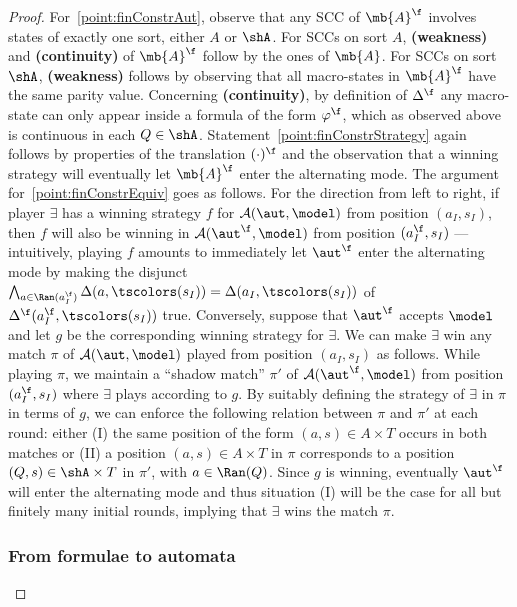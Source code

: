 \begin{proof}
For~\ref{point:finConstrAut}, observe that any SCC
of $\mb{A}^{\f}$ involves states of exactly one sort, either $A$ or $\shA$. For SCCs on sort $A$, \textbf{(weakness)} and \textbf{(continuity)} of $\mb{A}^{\f}$ follow by the ones of $\mb{A}$. For SCCs on sort $\shA$, \textbf{(weakness)} follows by observing that all macro-states in $\mb{A}^{\f}$ have the same parity value. Concerning \textbf{(continuity)}, by definition of $\Delta^{\f}$ any macro-state can only appear inside a formula of the form $\varphi^{\f}$, which as observed above is continuous in each $Q \in \shA$. Statement~\ref{point:finConstrStrategy} again follows by properties of the translation $(\cdot)^{\f}$ and the observation that a winning strategy will eventually let $\mb{A}^{\f}$ enter the alternating mode. The argument for~\ref{point:finConstrEquiv} goes as follows. For the direction from left to right, if player $\exists$ has a winning strategy $f$ for $\mathcal{A}(\aut,\model)$ from position $(a_I,s_I)$, then $f$ will also be winning in $\mathcal{A}(\aut^{\f},\model)$ from position $(a_I^{\f},s_I)$ --- intuitively, playing $f$ amounts to immediately let $\aut^{\f}$ enter the alternating mode by making the disjunct $\bigwedge_{a \in \Ran(a_I^{\f})}\Delta(a,\tscolors(s_I)) = \Delta(a_I,\tscolors(s_I))$ of $\Delta^{\f}(a_I^{\f},\tscolors(s_I))$ true. Conversely, suppose that $\aut^{\f}$ accepts $\model$ and let $g$ be the corresponding winning strategy for $\exists$. We can make $\exists$ win any match $\pi$ of $\mathcal{A}(\aut,\model)$ played from position $(a_I,s_I)$ as follows. While playing $\pi$, we maintain a ``shadow match'' $\pi'$ of $\mathcal{A}(\aut^{\f},\model)$ from position $(a_I^{\f},s_I)$ where $\exists$ plays according to $g$. By suitably defining the strategy of $\exists$ in $\pi$ in terms of $g$, we can enforce the following relation between $\pi$ and $\pi'$ at each round: either (I) the same position of the form $(a,s) \in A \times T$ occurs in both matches or (II) a position $(a,s) \in A \times T$ in $\pi$ corresponds to a position $(Q,s)  \in \shA \times T$ in $\pi'$, with $a \in \Ran(Q)$. Since $g$ is winning, eventually $\aut^{\f}$ will enter the alternating mode and thus situation (I) will be the case for all but finitely many initial rounds, implying that $\exists$ wins the match $\pi$.


\subsubsection{From formulae to automata}


\end{proof}
